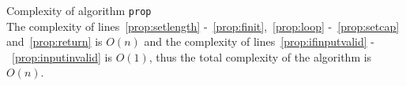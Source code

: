 \begin{sepproof}{Complexity of algorithm \texttt{prop}} \ \\
  The complexity of lines~\ref{prop:setlength} -~\ref{prop:finit},~\ref{prop:loop} -~\ref{prop:setcap} and~\ref{prop:return}
  is $O\left(n\right)$ and the complexity of lines~\ref{prop:ifinputvalid} -~\ref{prop:inputinvalid} is $O\left(1\right)$,
  thus the total complexity of the algorithm is $O\left(n\right)$.
\end{sepproof}
